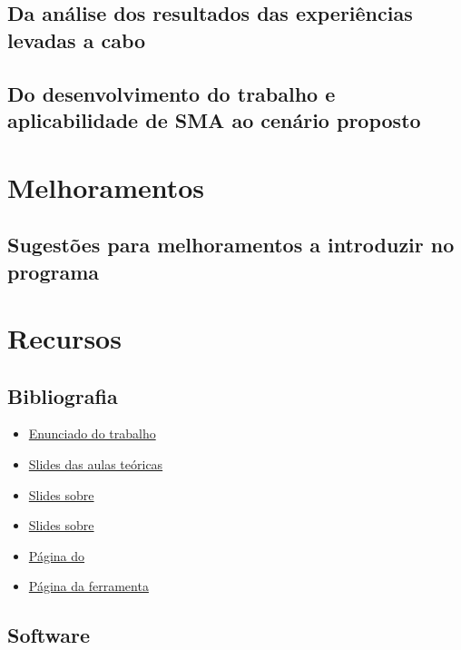 \documentclass[12pt]{report}
\begin{document}
\section{Da análise dos resultados das experiências levadas a cabo}

\section{Do desenvolvimento do trabalho e aplicabilidade de SMA ao cenário proposto}

\chapter{Melhoramentos}

\section{Sugestões para melhoramentos a introduzir no programa}

\chapter{Recursos}

\section{Bibliografia}

\begin{itemize}
	\item \href{https://paginas.fe.up.pt/~eol/AIAD/1617/trabalhos.html#T05}{Enunciado do trabalho}
	\item \href{https://paginas.fe.up.pt/~eol/AIAD/aiad1617.html}{Slides das aulas teóricas}
	\item \href{https://paginas.fe.up.pt/~eol/AIAD/aulas/jade_en.pdf}{Slides sobre \jade}
	\item \href{https://paginas.fe.up.pt/~eol/AIAD/aulas/REPAST_intro_hlc.pdf}{Slides sobre \repast}
	\item \href{https://web.fe.up.pt/~hlc/doku.php?id=sajas}{Página do \sajas}
	\item \href{https://web.fe.up.pt/~hlc/doku.php?id=massim2dev}{Página da ferramenta \massim}
\end{itemize}

\section{Software}
\end{document}
